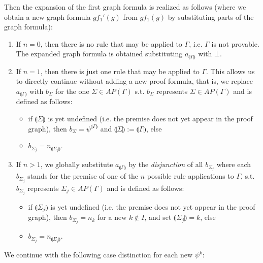 \documentclass{llncs}
\newcommand{\ind}[1]{\llparenthesis #1 \rrparenthesis}
\begin{document}
Then the expansion of the first graph formula is realized as follows (where we obtain a new graph formula
$gf_1'(g)$ from $gf_1(g)$ by substituting parts of the graph formula):
\begin{enumerate}
\item If $n=0$, then there is no rule that may be applied to $\Gamma$, i.e. $\Gamma$ is not provable. The expanded
graph formula is obtained substituting $a_{\ind{\Gamma}}$ with $\bot$.
\item If $n=1$, then there is just one rule that may be applied to $\Gamma$. This allows us to directly continue without adding
a new proof formula, that is, we replace $a_{\ind{\Gamma}}$ with $b_{\Sigma}$ for
the one $\Sigma\in AP(\Gamma)$ s.t. $b_{\Sigma}$ represents $\Sigma\in AP(\Gamma)$ and is defined as follows:
\begin{itemize}
\item if $\ind{\Sigma}$ is yet undefined (i.e. the premise does not yet appear in the
proof graph), then $b_{\Sigma}=\psi^{\ind{\Gamma}}$ and $\ind{\Sigma}:=\ind{\Gamma}$, else
\item $b_{\Sigma_j}=n_{\ind{\Sigma_j}}$.
\end{itemize}
\item If $n>1$, we globally substitute $a_{\ind{\Gamma}}$ by the
\emph{disjunction} of all $b_{\Sigma_j}$ where each $b_{\Sigma_j}$ stands for the premise of one of the $n$
possible rule applications to $\Gamma$, s.t. $b_{\Sigma_j}$ represents $\Sigma_j\in AP(\Gamma)$ and is defined as follows:
\begin{itemize}
\item if $\ind{\Sigma_j}$ is yet undefined (i.e. the premise does not yet appear in the
proof graph), then $b_{\Sigma_j}=n_k$ for a new $k\notin I$, and set $\ind{\Sigma_j}=k$, else
\item $b_{\Sigma_j}=n_{\ind{\Sigma_j}}$.
\end{itemize}
\end{enumerate}
We continue with the following case distinction for each new $\psi^k$:
\end{document}
